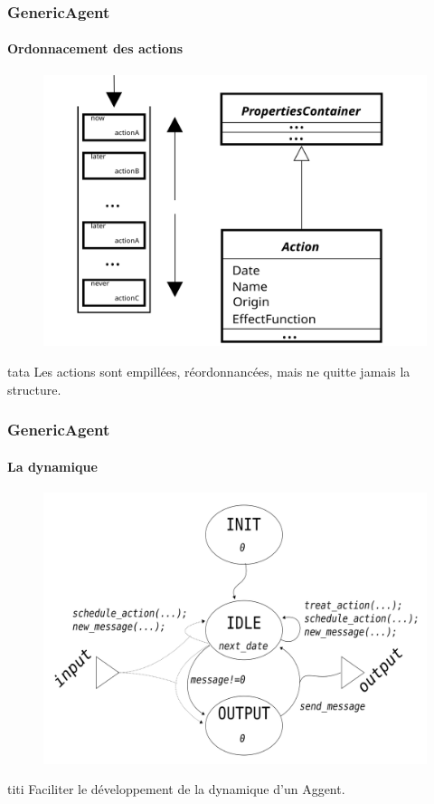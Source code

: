 \documentclass[xetex, compress, table, svgnames]{beamer}
\begin{document}
\begin{frame}
  \frametitle{GenericAgent}
  \framesubtitle{Ordonnacement des actions}
  \begin{figure}[h]
    \centering
    \includegraphics[width=.7\textwidth]{fig/ActionClassDiagramAndScheduller}
  \end{figure}
  \begin{alertblock}{tata}
    Les actions sont empillées, réordonnancées, mais ne quitte jamais la structure.
  \end{alertblock}
\end{frame}

\begin{frame}
  \frametitle{GenericAgent}
  \framesubtitle{La dynamique}
  \begin{figure}[h]
    \includegraphics[width=.65\textwidth]{fig/GenericAgentStates}
  \end{figure}
  \begin{block}{titi}
    Faciliter le développement de la dynamique d'un Aggent.
  \end{block}
\end{frame}
\end{document}
